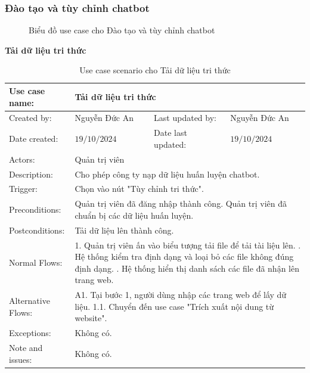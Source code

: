 \subsubsection{Đào tạo và tùy chỉnh chatbot}
\begin{figure}[H]
    \centering
     
    \vspace{0.5cm}
    \caption{Biểu đồ use case cho Đào tạo và tùy chỉnh chatbot}
    \label{fig:enter-label}
\end{figure}


\textbf{Tải dữ liệu tri thức}
\begin{table}[H]
	\centering
	\begin{tabular}{|l|l|l|l|} 
		\hline Use case name: & \multicolumn{3}{|l|}{Tải dữ liệu tri thức} \\ 
		\hline Created by: & Nguyễn Đức An & Last updated by: & Nguyễn Đức An \\ 
		\hline Date created: & $19 / 10 / 2024$ & Date last updated: & $19 / 10 / 2024$\\ 
		\hline Actors: & \multicolumn{3}{|l|}{ Quản trị viên } \\ 
		\hline Description: & \multicolumn{3}{|p{12cm}|}{ Cho phép công ty nạp dữ liệu huấn luyện chatbot. } \\ 
		\hline Trigger: & \multicolumn{3}{|p{12cm}|}{ Chọn vào nút "Tùy chỉnh tri thức". } \\ 
		\hline Preconditions: & \multicolumn{3}{|p{12cm}|}{ 
			Quản trị viên đã đăng nhập thành công. \newline 
			Quản trị viên đã chuẩn bị các dữ liệu huấn luyện. 
		} \\ 
		\hline Postconditions: & \multicolumn{3}{|p{12cm}|}{ Tải dữ liệu lên thành công. } \\ 
		\hline Normal Flows: & \multicolumn{3}{|p{12cm}|}{ 
			1. Quản trị viên ấn vào biểu tượng tải file để tải tài liệu lên. \newline 
			2. Hệ thống kiểm tra định dạng và loại bỏ các file không đúng định dạng. \newline 
			3. Hệ thống hiển thị danh sách các file đã nhận lên trang web. 
		} \\ 
		\hline Alternative Flows: & \multicolumn{3}{|p{12cm}|}{ 
			A1. Tại bước 1, người dùng nhập các trang web để lấy dữ liệu. \newline 
			\hspace{0.5cm}1.1. Chuyển đến use case "Trích xuất nội dung từ website". 
		} \\ 
		\hline Exceptions: & \multicolumn{3}{|p{12cm}|}{ Không có. } \\ 
		\hline Note and issues: & \multicolumn{3}{|p{12cm}|}{ Không có. } \\ 
		\hline
	\end{tabular}
	\caption{Use case scenario cho Tải dữ liệu tri thức}
\end{table}

